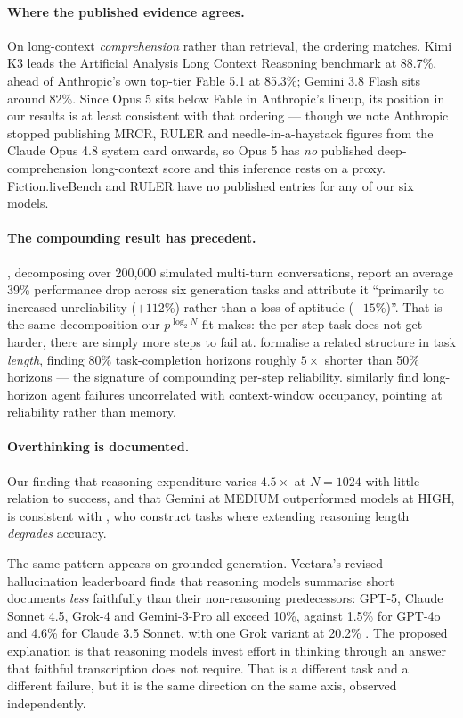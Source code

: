 \documentclass[11pt]{article}
\begin{document}
\paragraph{Where the published evidence agrees.} On long-context
\emph{comprehension} rather than retrieval, the ordering matches. Kimi K3 leads
the Artificial Analysis Long Context Reasoning benchmark at 88.7\%, ahead of
Anthropic's own top-tier Fable 5.1 at 85.3\%; Gemini 3.8 Flash sits around
82\%. Since Opus 5 sits below Fable in Anthropic's lineup, its position in our
results is at least consistent with that ordering --- though we note Anthropic
stopped publishing MRCR, RULER and needle-in-a-haystack figures from the Claude Opus
4.8 system card onwards, so Opus 5 has \emph{no} published deep-comprehension
long-context score and this inference rests on a proxy. Fiction.liveBench and
RULER have no published entries for any of our six models.

\paragraph{The compounding result has precedent.} \citet{laban2025multiturn},
decomposing over 200{,}000 simulated multi-turn conversations, report an
average 39\% performance drop across six generation tasks and attribute it
``primarily to increased unreliability ($+112\%$) rather than a loss of
aptitude ($-15\%$)''. That is the same decomposition our $p^{\log_2 N}$ fit
makes: the per-step task does not get harder, there are simply more steps to
fail at. \citet{kwa2025horizons} formalise a related structure in task
\emph{length}, finding 80\% task-completion horizons roughly $5\times$ shorter
than 50\% horizons --- the signature of compounding per-step reliability.
\citet{backlund2025} similarly find long-horizon agent failures uncorrelated
with context-window occupancy, pointing at reliability rather than memory.

\paragraph{Overthinking is documented.} Our finding that reasoning expenditure
varies $4.5\times$ at $N{=}1024$ with little relation to success, and that
Gemini at MEDIUM
outperformed models at HIGH, is consistent with \citet{gema2025inverse}, who
construct tasks where extending reasoning length \emph{degrades} accuracy.

The same pattern appears on grounded generation. Vectara's revised hallucination
leaderboard finds that reasoning models summarise short documents \emph{less}
faithfully than their non-reasoning predecessors: GPT-5, Claude Sonnet 4.5,
Grok-4 and Gemini-3-Pro all exceed 10\%, against 1.5\% for GPT-4o and 4.6\% for
Claude 3.5 Sonnet, with one Grok variant at 20.2\%
\citep{vectara2026,bang2025hallulens}. The proposed explanation is that
reasoning models invest effort in thinking through an answer that faithful
transcription does not require. That is a different task and a different
failure, but it is the same direction on the same axis, observed independently.
\end{document}
